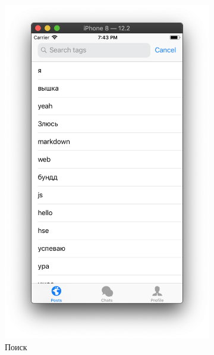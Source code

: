 \documentclass[a4paper,12pt]{article}
\begin{document}
\begin{figure}[h!]
\begin{subfigure}[b]{0.3\linewidth}
			\includegraphics[width=\linewidth]{../includes/pmi/search.png}
			\caption{\label{sub: search}Поиск}
		\end{subfigure}
		\begin{subfigure}[b]{0.3\linewidth}

\end{subfigure}
\end{figure}
\end{document}
